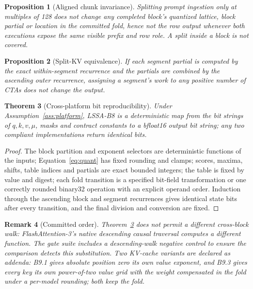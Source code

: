 \documentclass{article}
\newtheorem{Thm}{Theorem}[section]
\newtheorem{Prop}[Thm]{Proposition}
\newtheorem{Rem}[Thm]{Remark}
\begin{document}
\begin{Prop}[Aligned chunk invariance]
\label{prop:chunk}
Splitting prompt ingestion only at multiples of 128 does not change any completed block's
quantized lattice, block partial or location in the committed fold, hence not the row output
whenever both executions expose the same visible prefix and row role.  A split inside a
block is not covered.
\end{Prop}

\begin{Prop}[Split-KV equivalence]
\label{prop:split}
If each segment partial is computed by the exact within-segment recurrence and the partials
are combined by the ascending outer recurrence, assigning a segment's work to any positive
number of CTAs does not change the output.
\end{Prop}

\begin{Thm}[Cross-platform bit reproducibility]
\label{thm:determinism}
Under Assumption~\ref{ass:platform}, LSSA-B8 is a deterministic map from the bit strings of
$q,k,v,\mu$, masks and contract constants to a bfloat16 output bit string; any two compliant
implementations return identical bits.
\end{Thm}

\begin{proof}
The block partition and exponent selectors are deterministic functions of the inputs;
Equation~\eqref{eq:quant} has fixed rounding and clamps; scores, maxima, shifts, table
indices and partials are exact bounded integers; the table is fixed by value and digest;
each fold transition is a specified bit-field transformation or one correctly rounded
binary32 operation with an explicit operand order.  Induction through the ascending block and
segment recurrences gives identical state bits after every transition, and the final
division and conversion are fixed.
\end{proof}

\begin{Rem}[Committed order]
Theorem~\ref{thm:determinism} does not permit a different cross-block walk:
FlashAttention-3's native descending causal traversal computes a different function.  The
gate suite includes a descending-walk negative control to ensure the comparison detects this
substitution.  Two KV-cache variants are declared as addenda: B9.1 gives absolute position
zero its own value exponent, and B9.3 gives every key its own power-of-two value grid with the
weight compensated in the fold under a per-model rounding; both keep the fold.
\end{Rem}
\end{document}
